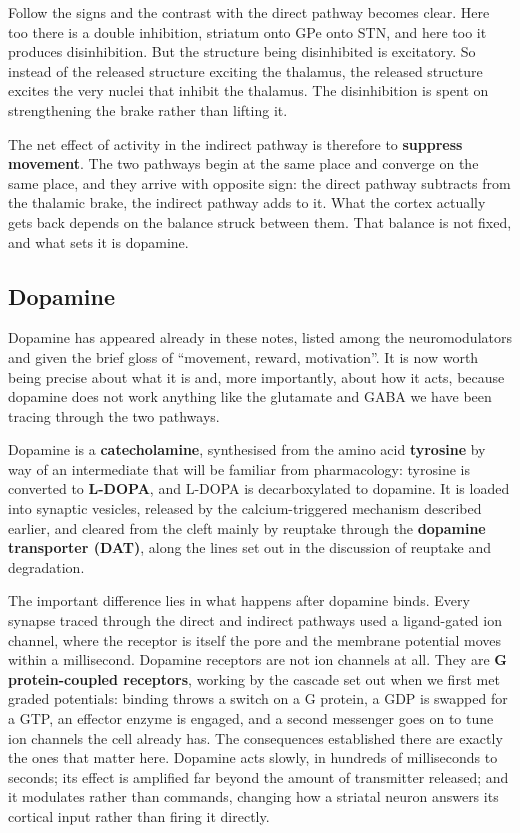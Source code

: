 \documentclass[11pt]{article}
\begin{document}
Follow the signs and the contrast with the direct pathway becomes clear. Here too there is a double inhibition, striatum onto GPe onto STN, and here too it produces disinhibition. But the structure being disinhibited is excitatory. So instead of the released structure exciting the thalamus, the released structure excites the very nuclei that inhibit the thalamus. The disinhibition is spent on strengthening the brake rather than lifting it.

The net effect of activity in the indirect pathway is therefore to \textbf{suppress movement}. The two pathways begin at the same place and converge on the same place, and they arrive with opposite sign: the direct pathway subtracts from the thalamic brake, the indirect pathway adds to it. What the cortex actually gets back depends on the balance struck between them. That balance is not fixed, and what sets it is dopamine.

\subsection{Dopamine}

Dopamine has appeared already in these notes, listed among the neuromodulators and given the brief gloss of ``movement, reward, motivation''. It is now worth being precise about what it is and, more importantly, about how it acts, because dopamine does not work anything like the glutamate and GABA we have been tracing through the two pathways.

Dopamine is a \textbf{catecholamine}, synthesised from the amino acid \textbf{tyrosine} by way of an intermediate that will be familiar from pharmacology: tyrosine is converted to \textbf{L-DOPA}, and L-DOPA is decarboxylated to dopamine. It is loaded into synaptic vesicles, released by the calcium-triggered mechanism described earlier, and cleared from the cleft mainly by reuptake through the \textbf{dopamine transporter (DAT)}, along the lines set out in the discussion of reuptake and degradation.

The important difference lies in what happens after dopamine binds. Every synapse traced through the direct and indirect pathways used a ligand-gated ion channel, where the receptor is itself the pore and the membrane potential moves within a millisecond. Dopamine receptors are not ion channels at all. They are \textbf{G protein-coupled receptors}, working by the cascade set out when we first met graded potentials: binding throws a switch on a G protein, a GDP is swapped for a GTP, an effector enzyme is engaged, and a second messenger goes on to tune ion channels the cell already has. The consequences established there are exactly the ones that matter here. Dopamine acts slowly, in hundreds of milliseconds to seconds; its effect is amplified far beyond the amount of transmitter released; and it modulates rather than commands, changing how a striatal neuron answers its cortical input rather than firing it directly.
\end{document}
